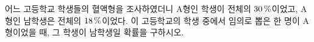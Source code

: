 어느 고등학교 학생들의 혈액형을 조사하였더니 $\mathrm{A}$형인 학생이 전체의 $30\mkern3mu \%$이었고, $\mathrm{A}$형인 남학생은 전체의 $18\mkern3mu \%$이었다. 이 고등학교의 학생 중에서 임의로 뽑은 한 명이 $\mathrm{A}$형이었을 때, 그 학생이 남학생일 확률을 구하시오.
